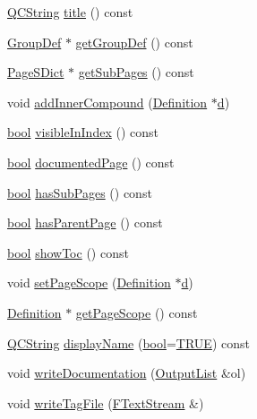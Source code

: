 \begin{DoxyCompactItemize}
\item 
\hyperlink{class_q_c_string}{Q\+C\+String} \hyperlink{class_page_def_adcd9f19205580e3265737bd2cd6e008d}{title} () const 
\item 
\hyperlink{class_group_def}{Group\+Def} $\ast$ \hyperlink{class_page_def_ab4eaf3e2d030c3d4f2a647b31b8a5316}{get\+Group\+Def} () const 
\item 
\hyperlink{class_page_s_dict}{Page\+S\+Dict} $\ast$ \hyperlink{class_page_def_a98a2dd10470954ab382b805e8bb6527b}{get\+Sub\+Pages} () const 
\item 
void \hyperlink{class_page_def_abe80a9454b6ec60ca084ae1eeb7e29ef}{add\+Inner\+Compound} (\hyperlink{class_definition}{Definition} $\ast$\hyperlink{060__command__switch_8tcl_af43f4b1f0064a33b2d662af9f06d3a00}{d})
\item 
\hyperlink{qglobal_8h_a1062901a7428fdd9c7f180f5e01ea056}{bool} \hyperlink{class_page_def_a4501306cd394ffd297830cfc7622a566}{visible\+In\+Index} () const 
\item 
\hyperlink{qglobal_8h_a1062901a7428fdd9c7f180f5e01ea056}{bool} \hyperlink{class_page_def_a61f698a0a9ba9360dd10b5fc931ec91b}{documented\+Page} () const 
\item 
\hyperlink{qglobal_8h_a1062901a7428fdd9c7f180f5e01ea056}{bool} \hyperlink{class_page_def_a664e548a40f0b323f0c44314b4436043}{has\+Sub\+Pages} () const 
\item 
\hyperlink{qglobal_8h_a1062901a7428fdd9c7f180f5e01ea056}{bool} \hyperlink{class_page_def_a31cb4b5814d98f770455ea4888df7985}{has\+Parent\+Page} () const 
\item 
\hyperlink{qglobal_8h_a1062901a7428fdd9c7f180f5e01ea056}{bool} \hyperlink{class_page_def_a193726acc0e42bee15df2d2bdbeff6d0}{show\+Toc} () const 
\item 
void \hyperlink{class_page_def_a8419470bbca997aed992512ddbfefcae}{set\+Page\+Scope} (\hyperlink{class_definition}{Definition} $\ast$\hyperlink{060__command__switch_8tcl_af43f4b1f0064a33b2d662af9f06d3a00}{d})
\item 
\hyperlink{class_definition}{Definition} $\ast$ \hyperlink{class_page_def_a08e90bec32738b6c626aac4787dbe856}{get\+Page\+Scope} () const 
\item 
\hyperlink{class_q_c_string}{Q\+C\+String} \hyperlink{class_page_def_a595fcfe254135e4c240f9829b04b7128}{display\+Name} (\hyperlink{qglobal_8h_a1062901a7428fdd9c7f180f5e01ea056}{bool}=\hyperlink{qglobal_8h_a04a6422a52070f0dc478693da640242b}{T\+R\+U\+E}) const 
\item 
void \hyperlink{class_page_def_a112d939dc57b93ef2e84682e0c54868c}{write\+Documentation} (\hyperlink{class_output_list}{Output\+List} \&ol)
\item 
void \hyperlink{class_page_def_aae9b036bbdf72ebb7062f3e8952dcca5}{write\+Tag\+File} (\hyperlink{class_f_text_stream}{F\+Text\+Stream} \&)
\end{DoxyCompactItemize}
